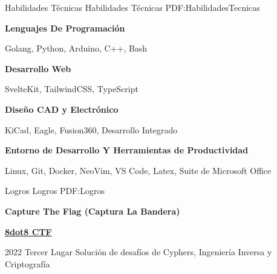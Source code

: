\documentclass[letterpaper,yyyy,draft]{simpleresumecv}
\begin{document}
\begin{Body}

\Section
{Habilidades Técnicas}
{Habilidades Técnicas}
{PDF:HabilidadesTecnicas}
{
    {
        \BulletItem{}
        \textbf{Lenguajes De Programación}
        \hfill
        \Gap{}
        \begin{Detail}
        \SubBulletItem{}
        Golang, Python, Arduino, C++, Bash
        \end{Detail}
    }

    {
        \Gap{}
        \BulletItem{}
        \textbf{Desarrollo Web}
        \hfill
        \Gap{}
        \begin{Detail}
        \SubBulletItem{}
        SvelteKit, TailwindCSS, TypeScript
        \end{Detail}
    }

    {
        \Gap{}
        \BulletItem{}
        \textbf{Diseño CAD y Electrónico}
        \hfill
        \Gap{}
        \begin{Detail}
        \SubBulletItem{}
        KiCad, Eagle, Fusion360, Desarrollo Integrado
        \end{Detail}
    }

    {
        \Gap{}
        \BulletItem{}
        \textbf{Entorno de Desarrollo Y Herramientas de Productividad}
        \hfill
        \Gap{}
        \begin{Detail}
        \SubBulletItem{}
        Linux, Git, Docker, NeoVim, VS Code, Latex, Suite de Microsoft Office
        \end{Detail}
    }
}



\Section
{Logros}
{Logros}
{PDF:Logros}
{
    \Entry{}
    \textbf{Capture The Flag (Captura La Bandera)}
    {
        \Gap{}
        \BulletItem{}
        \href{https://8dot8.org}{\textbf{8dot8 CTF}}
        \hfill
        \begin{Detail}
        \SubBulletItem{}
        2022 \- Tercer Lugar \- Solución de desafíos de Cyphers, Ingeniería Inversa y Criptografía
        \end{Detail}
    }

}
\end{Body}
\end{document}
